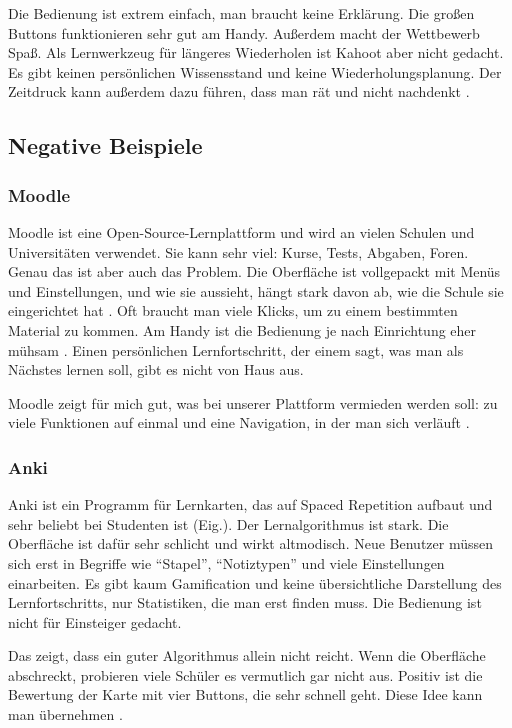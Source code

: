 Die Bedienung ist extrem einfach, man braucht keine Erklärung. Die großen Buttons funktionieren sehr gut am Handy. Außerdem macht der Wettbewerb Spaß. Als Lernwerkzeug für längeres Wiederholen ist Kahoot aber nicht gedacht. Es gibt keinen persönlichen Wissensstand und keine Wiederholungsplanung. Der Zeitdruck kann außerdem dazu führen, dass man rät und nicht nachdenkt \parencite{kahoot2026}.
 
 
\subsection{Negative Beispiele}
 
\subsubsection{Moodle}
 
Moodle ist eine Open-Source-Lernplattform und wird an vielen Schulen und Universitäten verwendet. Sie kann sehr viel: Kurse, Tests, Abgaben, Foren. Genau das ist aber auch das Problem. Die Oberfläche ist vollgepackt mit Menüs und Einstellungen, und wie sie aussieht, hängt stark davon ab, wie die Schule sie eingerichtet hat \parencite{lancaster2024}. Oft braucht man viele Klicks, um zu einem bestimmten Material zu kommen. Am Handy ist die Bedienung je nach Einrichtung eher mühsam \parencite{hasan2018}. Einen persönlichen Lernfortschritt, der einem sagt, was man als Nächstes lernen soll, gibt es nicht von Haus aus.
 
Moodle zeigt für mich gut, was bei unserer Plattform vermieden werden soll: zu viele Funktionen auf einmal und eine Navigation, in der man sich verläuft \parencite{moodle2026}.
 
 
\subsubsection{Anki}
 
Anki ist ein Programm für Lernkarten, das auf Spaced Repetition aufbaut und sehr beliebt bei Studenten ist (Eig.). Der Lernalgorithmus ist stark. Die Oberfläche ist dafür sehr schlicht und wirkt altmodisch. Neue Benutzer müssen sich erst in Begriffe wie \enquote{Stapel}, \enquote{Notiztypen} und viele Einstellungen einarbeiten. Es gibt kaum Gamification und keine übersichtliche Darstellung des Lernfortschritts, nur Statistiken, die man erst finden muss. Die Bedienung ist nicht für Einsteiger gedacht.
 
 
Das zeigt, dass ein guter Algorithmus allein nicht reicht. Wenn die Oberfläche abschreckt, probieren viele Schüler es vermutlich gar nicht aus. Positiv ist die Bewertung der Karte mit vier Buttons, die sehr schnell geht. Diese Idee kann man übernehmen \parencite{anki2026}.
 
